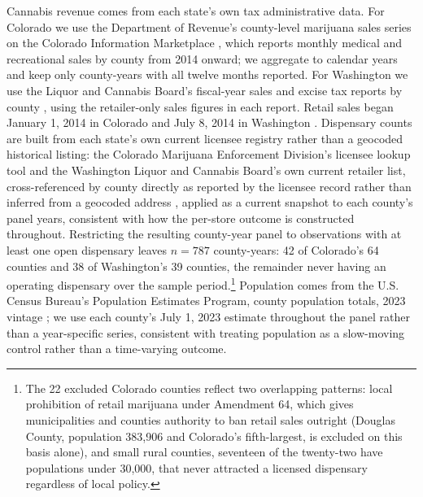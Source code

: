 \documentclass[12pt]{article}
\begin{document}
Cannabis revenue comes from each state's own tax administrative data. For Colorado we use the Department of
Revenue's county-level marijuana sales series on the Colorado Information Marketplace
\citep{COMarijuanaSalesByCounty}, which reports monthly medical and recreational sales by county from 2014
onward; we aggregate to calendar years and keep only county-years with all twelve months reported. For
Washington we use the Liquor and Cannabis Board's fiscal-year sales and excise tax reports by county
\citep{WALCBSalesByCounty}, using the retailer-only sales figures in each report. Retail sales began January
1, 2014 in Colorado \citep{COMedLicensees} and July 8, 2014 in Washington \citep{WSLCB2014FirstLicenses}.
Dispensary counts are built from each state's own current licensee registry rather than a geocoded historical
listing: the Colorado Marijuana Enforcement Division's licensee lookup tool \citep{COMedLicensees} and the
Washington Liquor and Cannabis Board's own current retailer list, cross-referenced by county directly as
reported by the licensee record rather than inferred from a geocoded address
\citep{WALCBLicenseeList,WALCBCannabisRetailers2026}, applied as a current snapshot to each county's panel
years, consistent with how the per-store outcome is constructed throughout. Restricting the resulting
county-year panel to observations with at least one open dispensary leaves $n=787$ county-years: 42 of
Colorado's 64 counties and 38 of Washington's 39 counties, the remainder never having an operating dispensary
over the sample period.\footnote{The 22 excluded Colorado counties reflect two overlapping patterns: local
prohibition of retail marijuana under Amendment 64, which gives municipalities and counties authority to ban
retail sales outright (Douglas County, population 383,906 and Colorado's fifth-largest, is excluded on this
basis alone), and small rural counties, seventeen of the twenty-two have populations under 30,000, that never
attracted a licensed dispensary regardless of local policy.} Population comes from the U.S. Census Bureau's
Population Estimates Program, county
population totals, 2023 vintage \citep{CensusPopEst2023}; we use each county's July 1, 2023 estimate
throughout the panel rather than a year-specific series, consistent with treating population as a
slow-moving control rather than a time-varying outcome.
\end{document}
